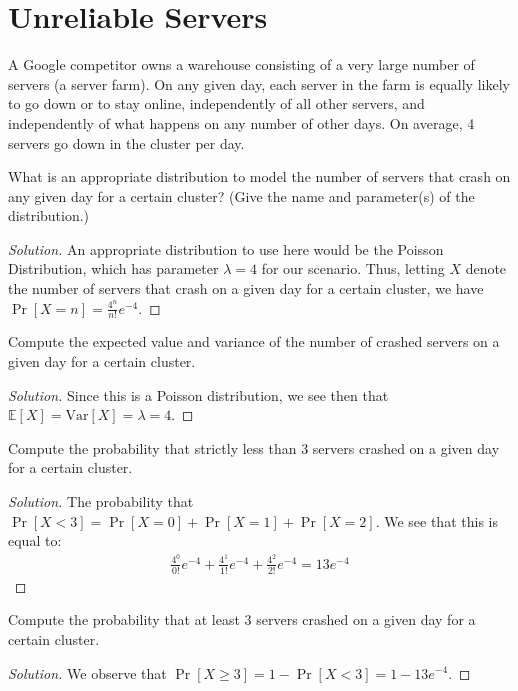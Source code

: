 \documentclass{article}
\newenvironment{solution}{\begin{proof}[Solution]}{\end{proof}}
\newcommand{\E}{\mathbb{E}}
\newcommand{\var}{\mathrm{Var}}
\begin{document}
\newpage

\section{Unreliable Servers}
A Google competitor owns a warehouse consisting of a very large number of servers (a server farm). On any given day, each server in the farm is equally likely to go down or to stay online, independently of all other servers, and independently of what happens on any number of other days. On average, 4 servers go down in the cluster per day.

\begin{hw}
	What is an appropriate distribution to model the number of servers that crash on any given day for a certain cluster? (Give the name and parameter(s) of the distribution.)
\end{hw}
\begin{solution}
	An appropriate distribution to use here would be the Poisson Distribution, which has parameter $\lambda = 4$ for our scenario. Thus, letting $X$ denote the number of servers that crash on a given day for a certain cluster, we have $\Pr[X = n] = \frac{4^{n}}{n!} e^{-4}$.
\end{solution}

\begin{hw}
	Compute the expected value and variance of the number of crashed servers on a given day for a certain cluster. 
\end{hw}
\begin{solution}
	Since this is a Poisson distribution, we see then that $\E[X] = \var[X] = \lambda = 4$.
\end{solution}

\begin{hw}
	Compute the probability that strictly less than 3 servers crashed on a given day for a certain cluster. 
\end{hw}
\begin{solution}
	The probability that $\Pr[X < 3] = \Pr[X = 0] + \Pr[X = 1] + \Pr[X = 2]$. We see that this is equal to:
	\begin{align*}
		\frac{4^{0}}{0!} e^{-4} + \frac{4^{1}}{1!} e^{-4} + \frac{4^{2}}{2!} e^{-4} = 13e^{-4}
	\end{align*}
\end{solution}

\begin{hw}
	Compute the probability that at least 3 servers crashed on a given day for a certain cluster.
\end{hw}
\begin{solution}
	We observe that $\Pr[X \geq 3] = 1 - \Pr[X < 3] = 1 - 13e^{-4}$.
\end{solution}
\end{document}
